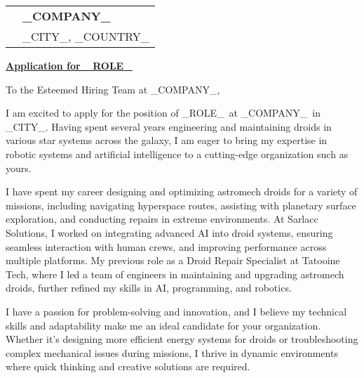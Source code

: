 \documentclass[10pt, a4paper]{article}
\begin{document}
\vspace{3cm}
\bigskip
\bigskip

\newcommand{\COMPANY}{_COMPANY_}
\newcommand{\ROLE}{_ROLE_}
\newcommand{\JobPostingURL}{_URL_}
\newcommand{\CITY}{_CITY_}
\newcommand{\COUNTRY}{_COUNTRY_}

\begin{tabular}{@{}p{0cm}l@{}} 
 & \textbf{\COMPANY} \\[0.8ex] 
 & \CITY, \COUNTRY
\end{tabular}

\bigskip %

\hfill {}

\noindent \textbf{\underline{Application for \href{\JobPostingURL}{\ROLE}}}

To the Esteemed Hiring Team at \COMPANY,

\bigskip

I am excited to apply for the position of \ROLE\ at \COMPANY\ in \CITY. Having spent several years engineering and maintaining droids in various star systems across the galaxy, I am eager to bring my expertise in robotic systems and artificial intelligence to a cutting-edge organization such as yours.

I have spent my career designing and optimizing astromech droids for a variety of missions, including navigating hyperspace routes, assisting with planetary surface exploration, and conducting repairs in extreme environments. At Sarlacc Solutions, I worked on integrating advanced AI into droid systems, ensuring seamless interaction with human crews, and improving performance across multiple platforms. My previous role as a Droid Repair Specialist at Tatooine Tech, where I led a team of engineers in maintaining and upgrading astromech droids, further refined my skills in AI, programming, and robotics.

I have a passion for problem-solving and innovation, and I believe my technical skills and adaptability make me an ideal candidate for your organization. Whether it’s designing more efficient energy systems for droids or troubleshooting complex mechanical issues during missions, I thrive in dynamic environments where quick thinking and creative solutions are required.
\end{document}
